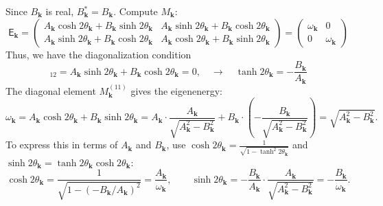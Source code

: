 \documentclass[aps, prx, nofootinbib, superscriptaddress]{revtex4-2}
\newcommand{\kvec}{\mathbf{k}}
\begin{document}
Since $ B_{\kvec} $ is real, $ B_{\kvec}^{*} = B_{\kvec} $.
Compute $ M_{\kvec} $:
\begin{equation}
    \mathsf{E}_{\kvec}
    = 
    \begin{pmatrix}
        A_{\kvec} \cosh 2\theta_{\kvec} + B_{\kvec} \sinh 2\theta_{\kvec} 
        & A_{\kvec} \sinh 2\theta_{\kvec} + B_{\kvec} \cosh 2\theta_{\kvec}\\
        A_{\kvec} \sinh 2\theta_{\kvec} + B_{\kvec} \cosh 2\theta_{\kvec} 
        & A_{\kvec} \cosh 2\theta_{\kvec} + B_{\kvec} \sinh 2\theta_{\kvec} 
    \end{pmatrix}
    = 
    \begin{pmatrix}
        \omega_{\kvec}
        & 0 \\ 0 & 
        \omega_{\kvec}
    \end{pmatrix}
\end{equation}
Thus, we have the diagonalization condition
\begin{equation}
    [\mathsf{E}_{\kvec}]_{12} = A_{\kvec} \sinh 2\theta_{\kvec} + B_{\kvec} \cosh 2\theta_{\kvec} = 0,
    \quad \rightarrow \quad
    \tanh 2\theta_{\kvec} = -\frac{B_{\kvec}}{A_{\kvec}}
\end{equation}
The diagonal element $M_{\kvec}^{(11)}$ gives the eigenenergy:
\begin{equation}
    \omega_{\kvec} 
    = A_{\kvec} \cosh 2\theta_{\kvec} + B_{\kvec} \sinh 2\theta_{\kvec} 
    = A_{\kvec} \cdot \frac{A_{\kvec}}{\sqrt{A_{\kvec}^2 - B_{\kvec}^2}} + B_{\kvec} \cdot \left(-\frac{B_{\kvec}}{\sqrt{A_{\kvec}^2 - B_{\kvec}^2}}\right) 
    = \sqrt{A_{\kvec}^2 - B_{\kvec}^2}.
\end{equation}
To express this in terms of $ A_{\kvec} $ and $ B_{\kvec} $, use $ \cosh 2\theta_{\kvec} = \frac{1}{\sqrt{1 - \tanh^2 2\theta_{\kvec}}} $ and $ \sinh 2\theta_{\kvec} = \tanh 2\theta_{\kvec} \cosh 2\theta_{\kvec} $:
\begin{equation*}
    \cosh 2\theta_{\kvec} = \frac{1}{\sqrt{1 - \left(-B_{\kvec} / A_{\kvec} \right)^2}} = \frac{A_{\kvec}}{\omega_{\kvec}},  
    \qquad 
    \sinh 2\theta_{\kvec} = -\frac{B_{\kvec}}{A_{\kvec}} \cdot \frac{A_{\kvec}}{\sqrt{A_{\kvec}^2 - B_{\kvec}^2}} = -\frac{B_{\kvec}}{\omega_{\kvec}}.
\end{equation*}
\end{document}
